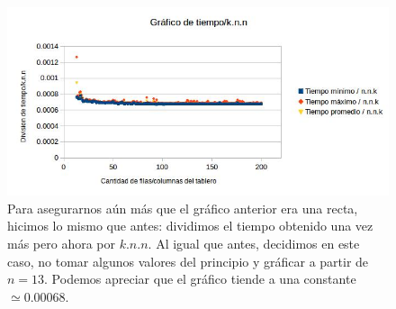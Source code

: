 \documentclass[a4paper]{article}
\begin{document}
\begin{figure}[h!]
\centering
\includegraphics[width=\textwidth]{conjBconst13.jpg}\caption{Para asegurarnos aún más que el gráfico anterior era una recta, hicimos lo mismo que antes: dividimos el tiempo obtenido una vez más pero ahora por $k.n.n$. Al igual que antes, decidimos en este caso, no tomar algunos valores del principio y gráficar a partir de $n = 13$. Podemos apreciar que el gráfico tiende a una constante $\simeq 0.00068$.}
\end{figure}
\end{document}
